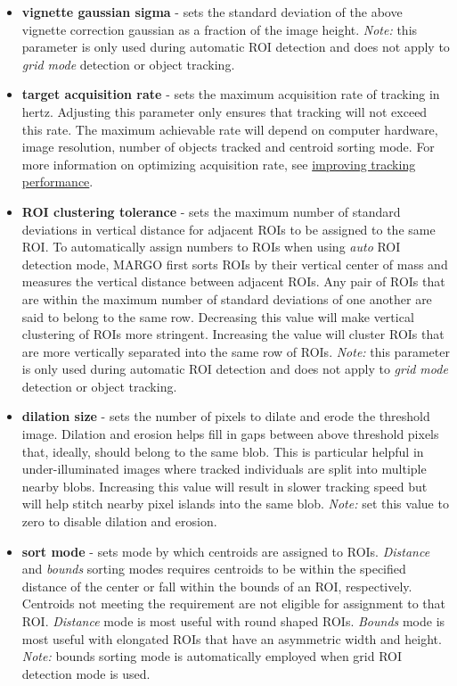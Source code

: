 \documentclass[11pt]{article}
\begin{document}
\begin{itemize}
	\item \textbf{vignette gaussian sigma} - sets the standard deviation of the above vignette correction gaussian as a fraction of the image height. \textit{Note:} this parameter is only used during automatic ROI detection and does not apply to \textit{grid mode} detection or object tracking.
	
	\item \textbf{target acquisition rate} - sets the maximum acquisition rate of tracking in hertz. Adjusting this parameter only ensures that tracking will not exceed this rate. The maximum achievable rate will depend on computer hardware, image resolution, number of objects tracked and centroid sorting mode. For more information on optimizing acquisition rate, see \hyperlink{trackingperformance}{improving tracking performance}. 
	
	\newpage
	\item \textbf{ROI clustering tolerance} - sets the maximum number of standard deviations in vertical distance for adjacent ROIs to be assigned to the same ROI. To automatically assign numbers to ROIs when using \textit{auto} ROI detection mode, MARGO first sorts ROIs by their vertical center of mass and measures the vertical distance between adjacent ROIs. Any pair of ROIs that are within the maximum number of standard deviations of one another are said to belong to the same row. Decreasing this value will make vertical clustering of ROIs more stringent. Increasing the value will cluster ROIs that are more vertically separated into the same row of ROIs. \textit{Note:} this parameter is only used during automatic ROI detection and does not apply to \textit{grid mode} detection or object tracking.
	
	\item \textbf{dilation size} - sets the number of pixels to dilate and erode the threshold image. Dilation and erosion helps fill in gaps between above threshold pixels that, ideally, should belong to the same blob. This is particular helpful in under-illuminated images where tracked individuals are split into multiple nearby blobs. Increasing this value will result in slower tracking speed but will help stitch nearby pixel islands into the same blob. \textit{Note:} set this value to zero to disable dilation and erosion. 
	
	\item \textbf{sort mode} - sets mode by which centroids are assigned to ROIs. \textit{Distance} and \textit{bounds} sorting modes requires centroids to be within the specified distance of the center or fall within the bounds of an ROI, respectively. Centroids not meeting the requirement are not eligible for assignment to that ROI. \textit{Distance} mode is most useful with round shaped ROIs. \textit{Bounds} mode is most useful with elongated ROIs that have an asymmetric width and height. \textit{Note:} bounds sorting mode is automatically employed when grid ROI detection mode is used.
	

\end{itemize}
\end{document}
